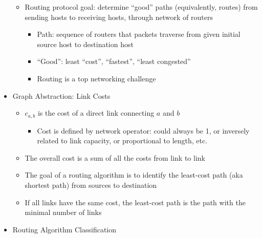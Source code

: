 \begin{itemize}
    \begin{itemize}

      \item Routing protocol goal: determine ``good'' paths (equivalently, routes) from sending hosts to receiving hosts, through network of routers

        \begin{itemize}

          \item Path: sequence of routers that packets traverse from given initial source host to destination host

          \item ``Good'': least ``cost'', ``fastest'', ``least congested''

          \item Routing is a top networking challenge

        \end{itemize}

    \end{itemize}

  \item Graph Abstraction: Link Costs

    \begin{itemize}

      \item $c_{a,b}$ is the cost of a direct link connecting $a$ and $b$

        \begin{itemize}

          \item Cost is defined by network operator: could always be 1, or inversely related to link capacity, or proportional to length, etc.

        \end{itemize}

      \item The overall cost is a sum of all the costs from link to link

      \item The goal of a routing algorithm is to identify the least-cost path (aka shortest path) from sources to destination

      \item If all links have the same cost, the least-cost path is the path with the minimal number of links

    \end{itemize}

  \item Routing Algorithm Classification


\end{itemize}
